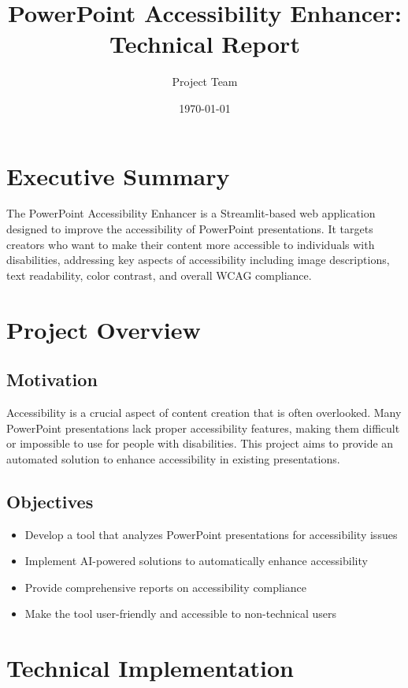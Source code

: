 \documentclass{article}
\title{PowerPoint Accessibility Enhancer: Technical Report}
\author{Project Team}
\date{\today}
\begin{document}
\maketitle

\section{Executive Summary}
The PowerPoint Accessibility Enhancer is a Streamlit-based web application designed to improve the accessibility of PowerPoint presentations. It targets creators who want to make their content more accessible to individuals with disabilities, addressing key aspects of accessibility including image descriptions, text readability, color contrast, and overall WCAG compliance.

\section{Project Overview}
\subsection{Motivation}
Accessibility is a crucial aspect of content creation that is often overlooked. Many PowerPoint presentations lack proper accessibility features, making them difficult or impossible to use for people with disabilities. This project aims to provide an automated solution to enhance accessibility in existing presentations.

\subsection{Objectives}
\begin{itemize}
    \item Develop a tool that analyzes PowerPoint presentations for accessibility issues
    \item Implement AI-powered solutions to automatically enhance accessibility
    \item Provide comprehensive reports on accessibility compliance
    \item Make the tool user-friendly and accessible to non-technical users
\end{itemize}

\section{Technical Implementation}
\end{document}
